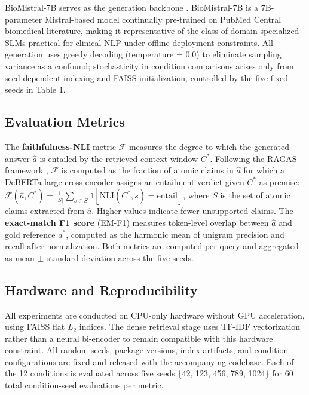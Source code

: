 \documentclass{article}
\begin{document}
\label{sec:small_language_model}

BioMistral-7B serves as the generation backbone \cite{labrak2024biomistral}. BioMistral-7B is a 7B-parameter Mistral-based model continually pre-trained on PubMed Central biomedical literature, making it representative of the class of domain-specialized SLMs practical for clinical NLP under offline deployment constraints. All generation uses greedy decoding (temperature = 0.0) to eliminate sampling variance as a confound; stochasticity in condition comparisons arises only from seed-dependent indexing and FAISS initialization, controlled by the five fixed seeds in Table 1.

\subsection{Evaluation Metrics}

\label{sec:evaluation_metrics}

The \textbf{faithfulness-NLI} metric $\mathcal{F}$ measures the degree to which the generated answer $\hat{a}$ is entailed by the retrieved context window $C^*$. Following the RAGAS framework \cite{es2023ragas}, $\mathcal{F}$ is computed as the fraction of atomic claims in $\hat{a}$ for which a DeBERTa-large cross-encoder assigns an entailment verdict given $C^*$ as premise: $\mathcal{F}(\hat{a}, C^*) = \frac{1}{|S|} \sum_{s \in S} \mathbb{1}[\text{NLI}(C^*, s) = \text{entail}]$, where $S$ is the set of atomic claims extracted from $\hat{a}$. Higher values indicate fewer unsupported claims. The \textbf{exact-match F1 score} (EM-F1) measures token-level overlap between $\hat{a}$ and gold reference $a^*$, computed as the harmonic mean of unigram precision and recall after normalization. Both metrics are computed per query and aggregated as mean $\pm$ standard deviation across the five seeds.

\subsection{Hardware and Reproducibility}

\label{sec:hardware_and_reproducibility}

All experiments are conducted on CPU-only hardware without GPU acceleration, using FAISS flat $L_2$ indices. The dense retrieval stage uses TF-IDF vectorization rather than a neural bi-encoder to remain compatible with this hardware constraint. All random seeds, package versions, index artifacts, and condition configurations are fixed and released with the accompanying codebase. Each of the 12 conditions is evaluated across five seeds \{42, 123, 456, 789, 1024\} for 60 total condition-seed evaluations per metric.
\end{document}
